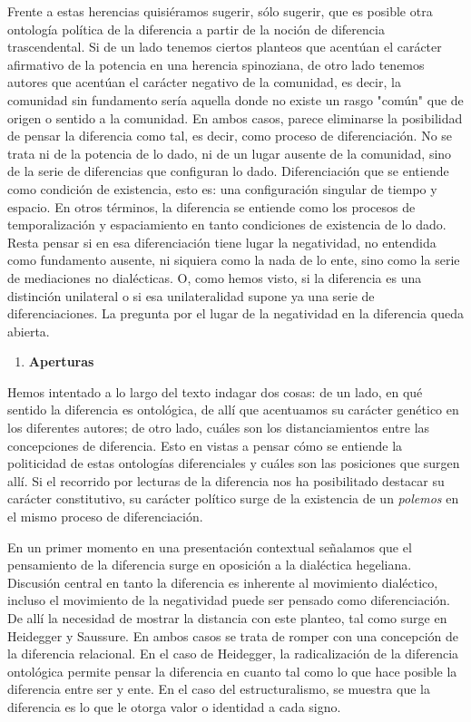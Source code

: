 \documentclass{book}
\begin{document}
Frente a estas herencias quisiéramos sugerir, sólo sugerir, que es
posible otra ontología política de la diferencia a partir de la noción
de diferencia trascendental. Si de un lado tenemos ciertos planteos que
acentúan el carácter afirmativo de la potencia en una herencia
spinoziana, de otro lado tenemos autores que acentúan el carácter
negativo de la comunidad, es decir, la comunidad sin fundamento sería
aquella donde no existe un rasgo "común" que de origen o sentido a la
comunidad. En ambos casos, parece eliminarse la posibilidad de pensar la
diferencia como tal, es decir, como proceso de diferenciación. No se
trata ni de la potencia de lo dado, ni de un lugar ausente de la
comunidad, sino de la serie de diferencias que configuran lo dado.
Diferenciación que se entiende como condición de existencia, esto es:
una configuración singular de tiempo y espacio. En otros términos, la
diferencia se entiende como los procesos de temporalización y
espaciamiento en tanto condiciones de existencia de lo dado. Resta
pensar si en esa diferenciación tiene lugar la negatividad, no entendida
como fundamento ausente, ni siquiera como la nada de lo ente, sino como
la serie de mediaciones no dialécticas. O, como hemos visto, si la
diferencia es una distinción unilateral o si esa unilateralidad supone
ya una serie de diferenciaciones. La pregunta por el lugar de la
negatividad en la diferencia queda abierta.

\begin{enumerate}
\def\labelenumi{\arabic{enumi}.}
\setcounter{enumi}{5}
\item
  \textbf{Aperturas}
\end{enumerate}

Hemos intentado a lo largo del texto indagar dos cosas: de un lado, en
qué sentido la diferencia es ontológica, de allí que acentuamos su
carácter genético en los diferentes autores; de otro lado, cuáles son
los distanciamientos entre las concepciones de diferencia. Esto en
vistas a pensar cómo se entiende la politicidad de estas ontologías
diferenciales y cuáles son las posiciones que surgen allí. Si el
recorrido por lecturas de la diferencia nos ha posibilitado destacar su
carácter constitutivo, su carácter político surge de la existencia de un
\emph{polemos} en el mismo proceso de diferenciación.

En un primer momento en una presentación contextual señalamos que el
pensamiento de la diferencia surge en oposición a la dialéctica
hegeliana. Discusión central en tanto la diferencia es inherente al
movimiento dialéctico, incluso el movimiento de la negatividad puede ser
pensado como diferenciación. De allí la necesidad de mostrar la
distancia con este planteo, tal como surge en Heidegger y Saussure. En
ambos casos se trata de romper con una concepción de la diferencia
relacional. En el caso de Heidegger, la radicalización de la diferencia
ontológica permite pensar la diferencia en cuanto tal como lo que hace
posible la diferencia entre ser y ente. En el caso del estructuralismo,
se muestra que la diferencia es lo que le otorga valor o identidad a
cada signo.
\end{document}
